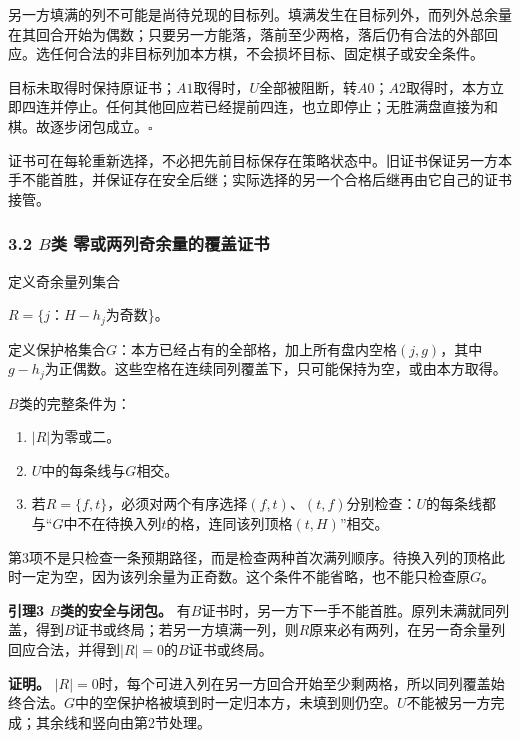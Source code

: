 \documentclass[
  a4paper,
]{article}
\providecommand{\tightlist}{%
  \setlength{\itemsep}{0pt}\setlength{\parskip}{0pt}}
\begin{document}
另一方填满的列不可能是尚待兑现的目标列。填满发生在目标列外，而列外总余量在其回合开始为偶数；只要另一方能落，落前至少两格，落后仍有合法的外部回应。选任何合法的非目标列加本方棋，不会损坏目标、固定棋子或安全条件。

目标未取得时保持原证书；\(A1\)取得时，\(U\)全部被阻断，转\(A0\)；\(A2\)取得时，本方立即四连并停止。任何其他回应若已经提前四连，也立即停止；无胜满盘直接为和棋。故逐步闭包成立。\(\square\)

证书可在每轮重新选择，不必把先前目标保存在策略状态中。旧证书保证另一方本手不能首胜，并保证存在安全后继；实际选择的另一个合格后继再由它自己的证书接管。

\subsubsection{\texorpdfstring{3.2 \(B\)类
零或两列奇余量的覆盖证书}{3.2 B类 零或两列奇余量的覆盖证书}}\label{bux7c7b-ux96f6ux6216ux4e24ux5217ux5947ux4f59ux91cfux7684ux8986ux76d6ux8bc1ux4e66}

定义奇余量列集合

\(R=\{j\)：\(H-h_j\)为奇数\}。

定义保护格集合\(G\)：本方已经占有的全部格，加上所有盘内空格\((j,g)\)，其中\(g-h_j\)为正偶数。这些空格在连续同列覆盖下，只可能保持为空，或由本方取得。

\(B\)类的完整条件为：

\begin{enumerate}
\def\labelenumi{\arabic{enumi}.}
\tightlist
\item
  \(|R|\)为零或二。
\item
  \(U\)中的每条线与\(G\)相交。
\item
  若\(R=\{f,t\}\)，必须对两个有序选择\((f,t)\)、\((t,f)\)分别检查：\(U\)的每条线都与``\(G\)中不在待换入列\(t\)的格，连同该列顶格\((t,H)\)''相交。
\end{enumerate}

第3项不是只检查一条预期路径，而是检查两种首次满列顺序。待换入列的顶格此时一定为空，因为该列余量为正奇数。这个条件不能省略，也不能只检查原\(G\)。

\textbf{引理3 \(B\)类的安全与闭包。}
有\(B\)证书时，另一方下一手不能首胜。原列未满就同列盖，得到\(B\)证书或终局；若另一方填满一列，则\(R\)原来必有两列，在另一奇余量列回应合法，并得到\(|R|=0\)的\(B\)证书或终局。

\textbf{证明。}
\(|R|=0\)时，每个可进入列在另一方回合开始至少剩两格，所以同列覆盖始终合法。\(G\)中的空保护格被填到时一定归本方，未填到则仍空。\(U\)不能被另一方完成；其余线和竖向由第2节处理。
\end{document}
